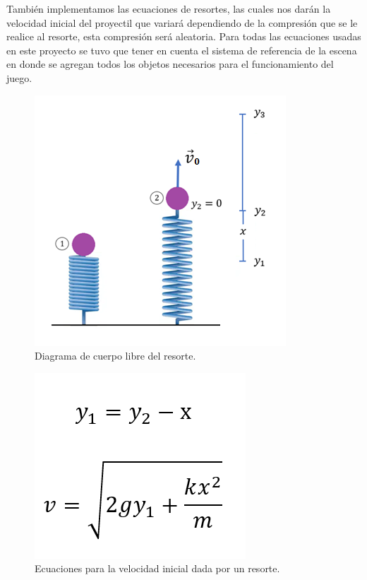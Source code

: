 \documentclass{article}
\begin{document}
También implementamos las ecuaciones de resortes, las cuales nos darán la velocidad inicial del proyectil que variará dependiendo de la compresión que se le realice al resorte, esta compresión será aleatoria. Para todas las ecuaciones usadas en este proyecto se tuvo que tener en cuenta el sistema de referencia de la escena en donde se agregan todos los objetos necesarios para el funcionamiento del juego.

\newpage
\begin{figure}[h]
\includegraphics[scale=1]{Images/diagramaresorte.png}
\centering
\caption{Diagrama de cuerpo libre del resorte.}
\label{fig:diagramaresorte}
\end{figure}

\begin{figure}[h]
\includegraphics[scale=0.7]{Images/ecuacionresorte.png}
\centering
\caption{Ecuaciones para la velocidad inicial dada por un resorte.}
\label{fig:ecuacionesresorte}
\end{figure}
\end{document}
